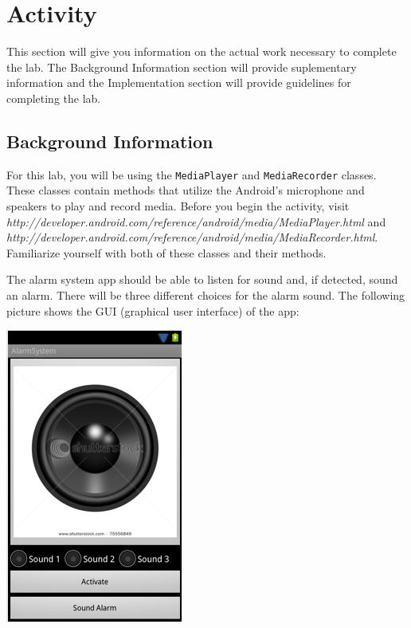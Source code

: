 \section{Activity}
This section will give you information on the actual work necessary to complete the lab. The Background Information section will provide suplementary information and the Implementation section will provide guidelines for completing the lab.
\subsection{Background Information}
For this lab, you will be using the \verb=MediaPlayer= and \verb=MediaRecorder= classes. These classes contain methods that utilize the Android's microphone and speakers to play and record media. Before you begin the activity, visit \textit{http://developer.android.com/reference/android/media/MediaPlayer.html} and \textit{http://developer.android.com/reference/android/media/MediaRecorder.html}. Familiarize yourself with both of these classes and their methods.

The alarm system app should be able to listen for sound and, if detected, sound an alarm. There will be three different choices for the alarm sound. The following picture shows the GUI (graphical user interface) of the app:
\begin{center}

\includegraphics[scale=0.4]{screenshot.png} 

\end{center}

